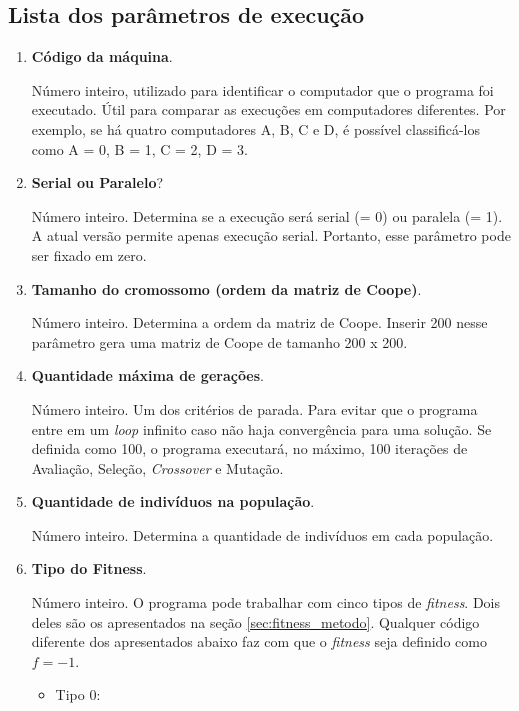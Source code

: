 \subsection{Lista dos parâmetros de execução}
\label{sec:listaParametros}
	\begin{enumerate}
		\item \textbf{Código da máquina}.
		
				Número inteiro, utilizado para identificar o computador que o programa foi executado. Útil para comparar as execuções em computadores diferentes. Por exemplo, se há quatro computadores A, B, C e D, é possível classificá-los como A = 0, B = 1, C = 2, D = 3.
				
		\item \textbf{Serial ou Paralelo}?
		
				Número inteiro. Determina se a execução será serial (= 0) ou paralela (= 1). A atual versão permite apenas execução serial. Portanto, esse parâmetro pode ser fixado em zero.
				
		\item \textbf{Tamanho do cromossomo (ordem da matriz de Coope)}.
		
				Número inteiro. Determina a ordem da matriz de Coope. Inserir 200 nesse parâmetro gera uma matriz de Coope de tamanho 200 x 200.
			
		\item \textbf{Quantidade máxima de gerações}.
		
				Número inteiro. Um dos critérios de parada. Para evitar que o programa entre em um \emph{loop} infinito caso não haja convergência para uma solução. Se definida como 100, o programa executará, no máximo, 100 iterações de Avaliação, Seleção, \emph{Crossover} e Mutação.
		
		\item \textbf{Quantidade de indivíduos na população}.
		
		Número inteiro. Determina a quantidade de indivíduos em cada população.
		
		\item \textbf{Tipo do Fitness}.
		
		Número inteiro. O programa pode trabalhar com cinco tipos de \emph{fitness}. Dois deles são os apresentados na seção \ref{sec:fitness_metodo}. Qualquer código diferente dos apresentados abaixo faz com que o \emph{fitness} seja definido como $f = -1$.
		
			\begin{itemize}
				\item Tipo  0:
				

\end{itemize}
\end{enumerate}
